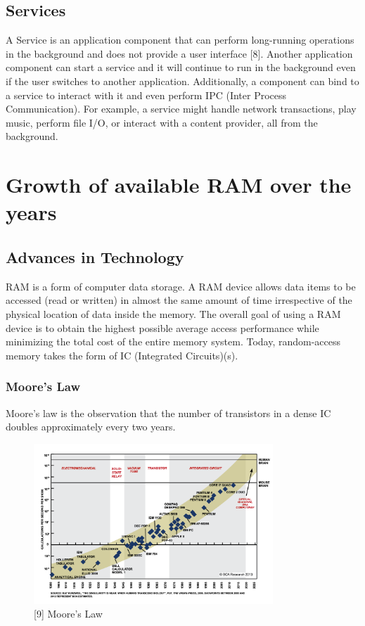 \documentclass[12pt]{uthesis-v12}  %
\begin{document}
			\subsection{Services}
				A Service is an application component that can perform long-running operations in the background and does not provide a user interface [8]. Another application component can start a service and it will continue to run in the background even if the user switches to another application. Additionally, a component can bind to a service to interact with it and even perform IPC (Inter Process Communication). For example, a service might handle network transactions, play music, perform file I/O, or interact with a content provider, all from the background.
					 	
	\section{Growth of available RAM over the years}
		
		\subsection{Advances in Technology}
			RAM is a form of computer data storage. A RAM device allows data items to be accessed (read or written) in almost the same amount of time irrespective of the physical location of data inside the memory. The overall goal of using a RAM device is to obtain the highest possible average access performance while minimizing the total cost of the entire memory system. Today, random-access memory takes the form of IC (Integrated Circuits)(s).
		
			\subsubsection{Moore's Law}
				Moore's law is the observation that the number of transistors in a dense IC doubles approximately every two years.
				
				\begin{figure}[h]
					\centering
					\includegraphics[width = 90mm]{images/mooresLaw.png}
					\caption[Moore's law]{[9] Moore's Law}
				\end{figure}
				
\end{document}
